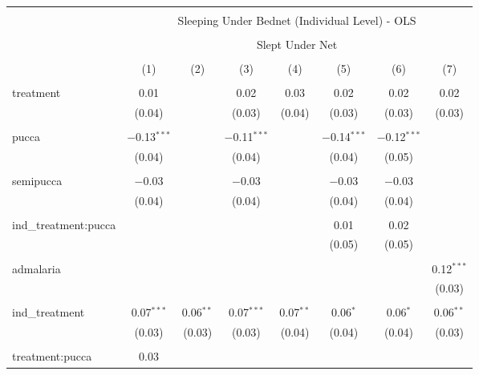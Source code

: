 
\begin{table}[!htbp] \centering 
  \caption{} 
  \label{tbl:Sleeping Under Bednet (Individual Level) - OLS} 
\begin{tabular}{@{\extracolsep{5pt}}lccccccc} 
\\[-1.8ex]\hline 
\hline \\[-1.8ex] 
 & \multicolumn{7}{c}{Sleeping Under Bednet (Individual Level) - OLS} \\ 
\cline{2-8} 
\\[-1.8ex] & \multicolumn{7}{c}{Slept Under Net} \\ 
\\[-1.8ex] & (1) & (2) & (3) & (4) & (5) & (6) & (7)\\ 
\hline \\[-1.8ex] 
 treatment & 0.01 &  & 0.02 & 0.03 & 0.02 & 0.02 & 0.02 \\ 
  & (0.04) &  & (0.03) & (0.04) & (0.03) & (0.03) & (0.03) \\ 
  & & & & & & & \\ 
 pucca & $-$0.13$^{***}$ &  & $-$0.11$^{***}$ &  & $-$0.14$^{***}$ & $-$0.12$^{***}$ &  \\ 
  & (0.04) &  & (0.04) &  & (0.04) & (0.05) &  \\ 
  & & & & & & & \\ 
 semipucca & $-$0.03 &  & $-$0.03 &  & $-$0.03 & $-$0.03 &  \\ 
  & (0.04) &  & (0.04) &  & (0.04) & (0.04) &  \\ 
  & & & & & & & \\ 
 ind\_treatment:pucca &  &  &  &  & 0.01 & 0.02 &  \\ 
  &  &  &  &  & (0.05) & (0.05) &  \\ 
  & & & & & & & \\ 
 admalaria &  &  &  &  &  &  & 0.12$^{***}$ \\ 
  &  &  &  &  &  &  & (0.03) \\ 
  & & & & & & & \\ 
 ind\_treatment & 0.07$^{***}$ & 0.06$^{**}$ & 0.07$^{***}$ & 0.07$^{**}$ & 0.06$^{*}$ & 0.06$^{*}$ & 0.06$^{**}$ \\ 
  & (0.03) & (0.03) & (0.03) & (0.04) & (0.04) & (0.04) & (0.03) \\ 
  & & & & & & & \\ 
 treatment:pucca & 0.03 &  &  &  &  &  &  \\ 

\end{tabular}
\end{table}
